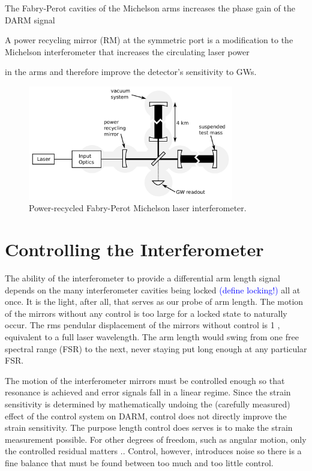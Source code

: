 The Fabry-Perot cavities of the Michelson arms increases the phase
gain of the DARM signal

A power recycling mirror (RM) at the symmetric port is a modification to the Michelson
interferometer that increases the circulating laser power 

in the arms and therefore
improve the detector's sensitivity to GWs.

\begin{figure}
\begin{centering}
\includegraphics[width=0.8\textwidth]{figures/IFOschematic.pdf}
\caption[Power-recycled Fabry-Perot Michelson laser
interferometer]{Power-recycled Fabry-Perot Michelson laser
  interferometer.}
\label{fig:IFOschematic}
\end{centering}
\end{figure}



\section{Controlling the Interferometer}
The ability of the interferometer to provide a differential arm length
signal depends on the many interferometer cavities being locked
\textcolor{blue}{(define locking!)} all at once. It is the light,
after all, that serves as our probe of arm length. The motion of the
mirrors without any control is too large for a locked state to
naturally occur. The rms pendular displacement of the mirrors without
control is 1 \micron, equivalent to a full laser wavelength. The arm
length would swing from one free spectral range (FSR) to the next,
never staying put long enough at any particular FSR.

The motion of the interferometer mirrors must be controlled enough so
that resonance is achieved and error signals fall in a linear
regime. Since the strain sensitivity is determined by mathematically
undoing the (carefully measured) effect of the control system on DARM,
control does not directly improve the strain sensitivity. The purpose
length control does serves is to make the strain measurement
possible. For other degrees of freedom, such as angular motion, only
the controlled residual matters ..
Control, however, introduces noise so there is a fine
balance that must be found between too much and too little control.

